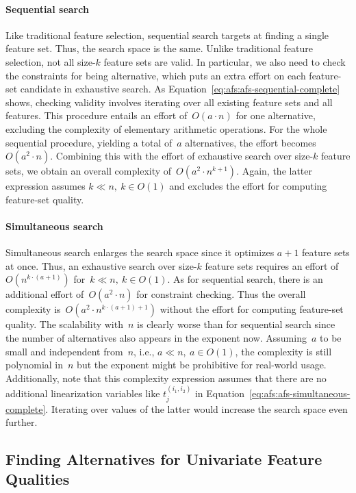 \documentclass{article}
\theoremstyle{definition}
\begin{document}
\paragraph{Sequential search}

Like traditional feature selection, sequential search targets at finding a single feature set.
Thus, the search space is the same.
Unlike traditional feature selection, not all size-$k$ feature sets are valid.
In particular, we also need to check the constraints for being alternative, which puts an extra effort on each feature-set candidate in exhaustive search.
As Equation~\ref{eq:afs:afs-sequential-complete} shows, checking validity involves iterating over all existing feature sets and all features.
This procedure entails an effort of~$O(a \cdot n)$ for one alternative, excluding the complexity of elementary arithmetic operations.
For the whole sequential procedure, yielding a total of~$a$ alternatives, the effort becomes~$O(a^2 \cdot n)$.
Combining this with the effort of exhaustive search over size-$k$ feature sets, we obtain an overall complexity of~$O(a^2 \cdot n^{k+1})$.
Again, the latter expression assumes $k \ll n,~k \in O(1)$ and excludes the effort for computing feature-set quality.

\paragraph{Simultaneous search}

Simultaneous search enlarges the search space since it optimizes $a+1$ feature sets at once.
Thus, an exhaustive search over size-$k$ feature sets requires an effort of~$O(n^{k \cdot (a+1)})$ for~$k \ll n,~k \in O(1)$.
As for sequential search, there is an additional effort of~$O(a^2 \cdot n)$ for constraint checking.
Thus the overall complexity is~$O(a^2 \cdot n^{k \cdot (a+1) + 1})$ without the effort for computing feature-set quality.
The scalability with~$n$ is clearly worse than for sequential search since the number of alternatives also appears in the exponent now.
Assuming~$a$ to be small and independent from~$n$, i.e., $a \ll n,~a \in O(1)$, the complexity is still polynomial in~$n$ but the exponent might be prohibitive for real-world usage.
Additionally, note that this complexity expression assumes that there are no additional linearization variables like $t^{(i_1,i_2)}_j$ in Equation~\ref{eq:afs:afs-simultaneous-complete}.
Iterating over values of the latter would increase the search space even further.

\subsection{Finding Alternatives for Univariate Feature Qualities}
\label{sec:afs:appendix:univariate-search-algorithm}
\end{document}
